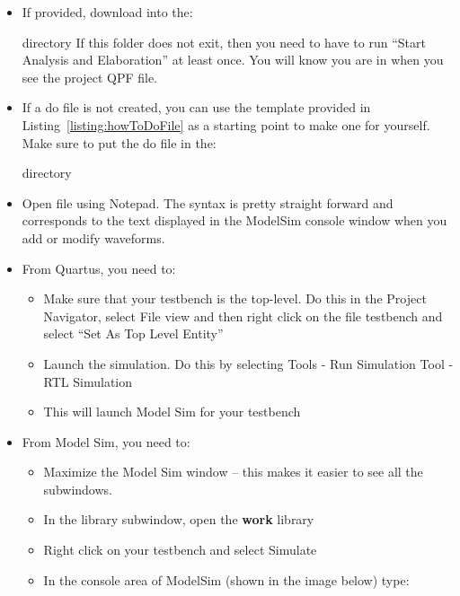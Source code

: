 \begin{itemize}
    \item
        If provided, download   into the:

         directory
        If this folder does not exit, then you need to have to run
        ``Start Analysis and Elaboration'' at least once. You will know you are in
         when you see the project QPF file.

    \item
        If a do file is not created, you can use the template provided in
        Listing~\ref{listing:howToDoFile} as a starting point to make one
        for yourself. Make sure to put the do file in the:

         directory
    \item
        Open  file using Notepad.
        The syntax is pretty straight forward and corresponds to the text
        displayed in the ModelSim console window when you add or modify
        waveforms.
    \item
        From Quartus, you need to:

        \begin{itemize}
            \item
                Make sure that your testbench is the top-level. Do this in the
                Project Navigator, select File view and then right click on the file
                testbench and select ``Set As Top Level Entity''
            \item
                Launch the simulation. Do this by selecting Tools -\> Run Simulation Tool -\> RTL Simulation
            \item
                This will launch Model Sim for your testbench
        \end{itemize}
    \item
        From Model Sim, you need to:

        \begin{itemize}
            \item
                Maximize the Model Sim window -- this makes it easier to see all the
                subwindows.
            \item
                In the library subwindow, open the \textbf{work} library
            \item
                Right click on your testbench and select Simulate
            \item
                In the console area of ModelSim (shown in the image below) type:
        \end{itemize}


\end{itemize}

